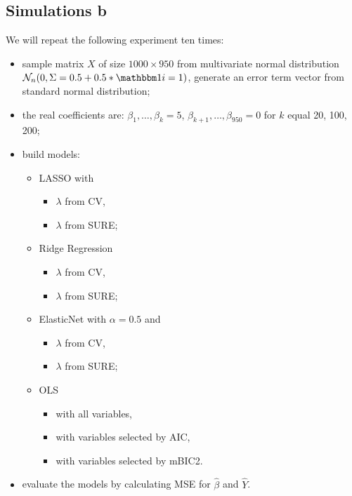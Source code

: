 \documentclass[
]{article}
\begin{document}
\hypertarget{simulations-b}{%
\subsection{Simulations b}\label{simulations-b}}

We will repeat the following experiment ten times:

\begin{itemize}
\item
  sample matrix \(X\) of size \(1000 \times 950\) from multivariate
  normal distribution
  \(\mathcal N_n (0, \Sigma = 0.5 + 0.5*\mathbbm 1 {i=1})\), generate an
  error term vector from standard normal distribution;
\item
  the real coefficients are: \(\beta_1, \ldots, \beta_k = 5\),
  \(\beta_{k+1}, \ldots, \beta_{950} = 0\) for \(k\) equal 20, 100, 200;
\item
  build models:

  \begin{itemize}
  \item
    LASSO with

    \begin{itemize}
    \item
      \(\lambda\) from CV,
    \item
      \(\lambda\) from SURE;
    \end{itemize}
  \item
    Ridge Regression

    \begin{itemize}
    \item
      \(\lambda\) from CV,
    \item
      \(\lambda\) from SURE;
    \end{itemize}
  \item
    ElasticNet with \(\alpha=0.5\) and

    \begin{itemize}
    \item
      \(\lambda\) from CV,
    \item
      \(\lambda\) from SURE;
    \end{itemize}
  \item
    OLS

    \begin{itemize}
    \item
      with all variables,
    \item
      with variables selected by AIC,
    \item
      with variables selected by mBIC2.
    \end{itemize}
  \end{itemize}
\item
  evaluate the models by calculating MSE for \(\hat\beta\) and
  \(\hat Y\).
\end{itemize}
\end{document}
